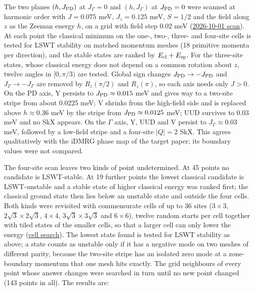 The two planes \((h,J_{\rm PD})\) at \(J_\Gamma=0\) and
\((h,J_\Gamma)\) at \(J_{\rm PD}=0\) were scanned at harmonic order with
\(J=0.075\) meV, \(J_z=0.125\) meV, \(S=1/2\) and the field along \(z\)
as the Zeeman energy \(h\), on a grid with field step 0.02 meV
(\href{../../../data-space/verification/261001-nbcp-harmonic-phase-diagram/README.md}{2026-10-01
scan}). At each point the classical minimum on the one-, two-, three-
and four-site cells is tested for LSWT stability on matched momentum
meshes (18 primitive momenta per direction), and the stable states are
ranked by \(E_{\rm cl}+E_{\rm zp}\). For the three-site states, whose
classical energy does not depend on a common rotation about \(z\), twelve
angles in \([0,\pi/3)\) are tested. Global sign changes
\(J_{\rm PD}\to-J_{\rm PD}\) and \(J_\Gamma\to-J_\Gamma\) are removed by
\(R_z(\pi/2)\) and \(R_z(\pi)\), so each axis needs only \(J>0\). On the
PD axis, Y persists to \(J_{\rm PD}\approx0.015\) meV and gives way to a
two-site stripe from about 0.0225 meV; V shrinks from the high-field side
and is replaced above \(h\approx0.36\) meV by the stripe from
\(J_{\rm PD}\approx0.0125\) meV; UUD survives to 0.03 meV and no SkX
appears. On the \(\Gamma\) axis, Y, UUD and V
persist to \(J_\Gamma\approx0.03\) meV, followed by a low-field stripe
and a four-site \(|Q|=2\) SkX. This agrees qualitatively with the
iDMRG phase map of the target paper; its boundary values were not
compared.

The four-site scan leaves two kinds of point undetermined. At 45 points
no candidate is LSWT-stable. At 19 further points the lowest classical
candidate is LSWT-unstable and a stable state of higher classical energy
was ranked first; the classical ground state then lies below an unstable
state and outside the four cells. Both kinds were revisited with
commensurate cells of up to 36 sites (\(3\times3\),
\(2\sqrt3\times2\sqrt3\), \(4\times4\), \(3\sqrt3\times3\sqrt3\) and
\(6\times6\)), twelve random starts per cell together with tiled states
of the smaller cells, so that a larger cell can only lower the energy
(\href{../../../data-space/verification/261005-nbcp-hatched-region/hatched-region-check.json}{cell
search}). The lowest state found is tested for LSWT stability as above;
a state counts as unstable only if it has a negative mode on two meshes
of different parity, because the two-site stripe has an isolated zero
mode at a zone-boundary momentum that one mesh hits exactly. The grid
neighbours of every point whose answer changes were searched in turn
until no new point changed (143 points in all). The results are:

